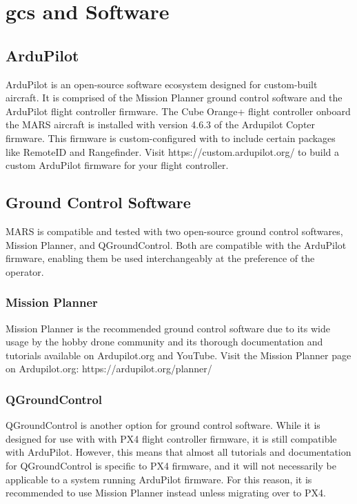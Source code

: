\section{\ac{gcs} and Software}\label{sec:gcssoftware}
\subsection{ArduPilot}
ArduPilot is an open-source software ecosystem designed for custom-built aircraft. It is comprised of the Mission Planner ground control software and the ArduPilot flight controller firmware. The Cube Orange+ flight controller onboard the MARS aircraft is installed with version 4.6.3 of the Ardupilot Copter firmware. This firmware is custom-configured with to include certain packages like RemoteID and Rangefinder. Visit https://custom.ardupilot.org/ to build a custom ArduPilot firmware for your flight controller.

\subsection{Ground Control Software}
MARS is compatible and tested with two open-source ground control softwares, Mission Planner, and QGroundControl. Both are compatible with the ArduPilot firmware, enabling them be used interchangeably at the preference of the operator.
    \subsubsection{Mission Planner}
    Mission Planner is the recommended ground control software due to its wide usage by the hobby drone community and its thorough documentation and tutorials available on Ardupilot.org and YouTube. Visit the Mission Planner page on Ardupilot.org: https://ardupilot.org/planner/
        
    \subsubsection{QGroundControl}
    QGroundControl is another option for ground control software. While it is designed for use with with PX4 flight controller firmware, it is still compatible with ArduPilot. However, this means that almost all tutorials and documentation for QGroundControl is specific to PX4 firmware, and it will not necessarily be applicable to a system running ArduPilot firmware. For this reason, it is recommended to use Mission Planner instead unless migrating over to PX4.

